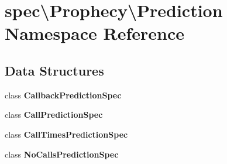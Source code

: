 \section{spec\textbackslash{}Prophecy\textbackslash{}Prediction Namespace Reference}
\label{namespacespec_1_1_prophecy_1_1_prediction}
\subsection*{Data Structures}
\begin{DoxyCompactItemize}
\item 
class {\bf Callback\+Prediction\+Spec}
\item 
class {\bf Call\+Prediction\+Spec}
\item 
class {\bf Call\+Times\+Prediction\+Spec}
\item 
class {\bf No\+Calls\+Prediction\+Spec}
\end{DoxyCompactItemize}
